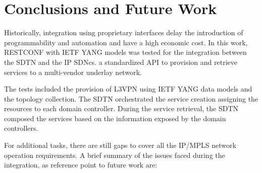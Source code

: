 \documentclass[10pt, conference]{IEEEtran}
\begin{document}
\section{Conclusions and Future Work}
\label{section:conclusions}
 
 Historically, integration using proprietary interfaces delay the introduction of programmability and automation and have a high economic cost. In this work, RESTCONF with IETF YANG models was tested for the integration between the SDTN  and the IP SDNcs.  a standardized  API to provision and retrieve services to a multi-vendor underlay network. 

The tests included the provision of L3VPN using IETF YANG data models and the topology collection. The SDTN  orchestrated the service creation assigning the resources to each domain controller. During the service retrieval, the SDTN  composed the services based on the information exposed by the domain controllers.

For additional tasks, there are still gaps to cover all the IP/MPLS network operation requirements. A brief summary of the issues faced during the integration, as reference point to future work are: 
\end{document}
